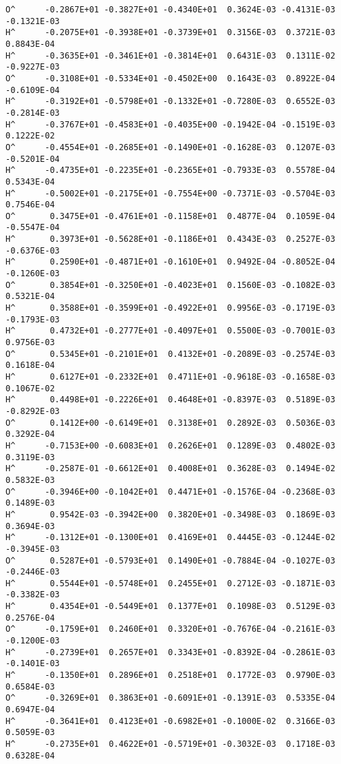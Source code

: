 \begin{verbatim}
O^      -0.2867E+01 -0.3827E+01 -0.4340E+01  0.3624E-03 -0.4131E-03 -0.1321E-03
H^      -0.2075E+01 -0.3938E+01 -0.3739E+01  0.3156E-03  0.3721E-03  0.8843E-04
H^      -0.3635E+01 -0.3461E+01 -0.3814E+01  0.6431E-03  0.1311E-02 -0.9227E-03
O^      -0.3108E+01 -0.5334E+01 -0.4502E+00  0.1643E-03  0.8922E-04 -0.6109E-04
H^      -0.3192E+01 -0.5798E+01 -0.1332E+01 -0.7280E-03  0.6552E-03 -0.2814E-03
H^      -0.3767E+01 -0.4583E+01 -0.4035E+00 -0.1942E-04 -0.1519E-03  0.1222E-02
O^      -0.4554E+01 -0.2685E+01 -0.1490E+01 -0.1628E-03  0.1207E-03 -0.5201E-04
H^      -0.4735E+01 -0.2235E+01 -0.2365E+01 -0.7933E-03  0.5578E-04  0.5343E-04
H^      -0.5002E+01 -0.2175E+01 -0.7554E+00 -0.7371E-03 -0.5704E-03  0.7546E-04
O^       0.3475E+01 -0.4761E+01 -0.1158E+01  0.4877E-04  0.1059E-04 -0.5547E-04
H^       0.3973E+01 -0.5628E+01 -0.1186E+01  0.4343E-03  0.2527E-03 -0.6376E-03
H^       0.2590E+01 -0.4871E+01 -0.1610E+01  0.9492E-04 -0.8052E-04 -0.1260E-03
O^       0.3854E+01 -0.3250E+01 -0.4023E+01  0.1560E-03 -0.1082E-03  0.5321E-04
H^       0.3588E+01 -0.3599E+01 -0.4922E+01  0.9956E-03 -0.1719E-03 -0.1793E-03
H^       0.4732E+01 -0.2777E+01 -0.4097E+01  0.5500E-03 -0.7001E-03  0.9756E-03
O^       0.5345E+01 -0.2101E+01  0.4132E+01 -0.2089E-03 -0.2574E-03  0.1618E-04
H^       0.6127E+01 -0.2332E+01  0.4711E+01 -0.9618E-03 -0.1658E-03  0.1067E-02
H^       0.4498E+01 -0.2226E+01  0.4648E+01 -0.8397E-03  0.5189E-03 -0.8292E-03
O^       0.1412E+00 -0.6149E+01  0.3138E+01  0.2892E-03  0.5036E-03  0.3292E-04
H^      -0.7153E+00 -0.6083E+01  0.2626E+01  0.1289E-03  0.4802E-03  0.3119E-03
H^      -0.2587E-01 -0.6612E+01  0.4008E+01  0.3628E-03  0.1494E-02  0.5832E-03
O^      -0.3946E+00 -0.1042E+01  0.4471E+01 -0.1576E-04 -0.2368E-03  0.1489E-03
H^       0.9542E-03 -0.3942E+00  0.3820E+01 -0.3498E-03  0.1869E-03  0.3694E-03
H^      -0.1312E+01 -0.1300E+01  0.4169E+01  0.4445E-03 -0.1244E-02 -0.3945E-03
O^       0.5287E+01 -0.5793E+01  0.1490E+01 -0.7884E-04 -0.1027E-03 -0.2446E-03
H^       0.5544E+01 -0.5748E+01  0.2455E+01  0.2712E-03 -0.1871E-03 -0.3382E-03
H^       0.4354E+01 -0.5449E+01  0.1377E+01  0.1098E-03  0.5129E-03  0.2576E-04
O^      -0.1759E+01  0.2460E+01  0.3320E+01 -0.7676E-04 -0.2161E-03 -0.1200E-03
H^      -0.2739E+01  0.2657E+01  0.3343E+01 -0.8392E-04 -0.2861E-03 -0.1401E-03
H^      -0.1350E+01  0.2896E+01  0.2518E+01  0.1772E-03  0.9790E-03  0.6584E-03
O^      -0.3269E+01  0.3863E+01 -0.6091E+01 -0.1391E-03  0.5335E-04  0.6947E-04
H^      -0.3641E+01  0.4123E+01 -0.6982E+01 -0.1000E-02  0.3166E-03  0.5059E-03
H^      -0.2735E+01  0.4622E+01 -0.5719E+01 -0.3032E-03  0.1718E-03  0.6328E-04

\end{verbatim}
